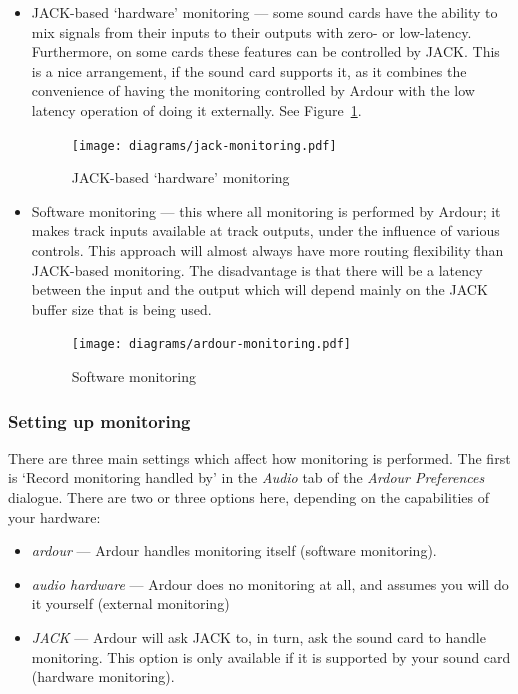 \documentclass[10pt,a4paper]{book}
\begin{document}
{\begin{itemize}
\item JACK-based `hardware' monitoring --- some sound cards have the
  ability to mix signals from their inputs to their outputs with zero-
  or low-latency.  Furthermore, on some cards these features can be
  controlled by JACK\@.  This is a nice arrangement, if the sound card
  supports it, as it combines the convenience of having the monitoring
  controlled by Ardour with the low latency operation of doing it
  externally.  See Figure~\ref{fig:jack-monitoring}.

\begin{figure}[ht]
\begin{center}
\texttt{[image: diagrams/jack-monitoring.pdf]}
\end{center}
\caption{JACK-based `hardware' monitoring}
\label{fig:jack-monitoring}
\end{figure}

\item Software monitoring --- this where all monitoring is performed
  by Ardour; it makes track inputs available at track outputs, under
  the influence of various controls.  This approach will almost always
  have more routing flexibility than JACK-based monitoring.  The
  disadvantage is that there will be a latency between the input and
  the output which will depend mainly on the JACK buffer size that is
  being used.

\begin{figure}[ht]
\begin{center}
\texttt{[image: diagrams/ardour-monitoring.pdf]}
\end{center}
\caption{Software monitoring}
\label{fig:ardour-monitoring}
\end{figure}

\end{itemize}

\subsubsection{Setting up monitoring}

There are three main settings which affect how monitoring is
performed.  The first is `Record monitoring handled by' in the
\emph{Audio} tab of the \emph{Ardour Preferences} dialogue.  There are
two or three options here, depending on the capabilities of your
hardware:

\begin{itemize}
\item \emph{ardour} --- Ardour handles monitoring itself (software monitoring).
\item \emph{audio hardware} --- Ardour does no monitoring at all, and
  assumes you will do it yourself (external monitoring)
\item \emph{JACK} --- Ardour will ask JACK to, in turn, ask the sound
  card to handle monitoring.  This option is only available if it is
  supported by your sound card (hardware monitoring).
\end{itemize}

}
\end{document}
